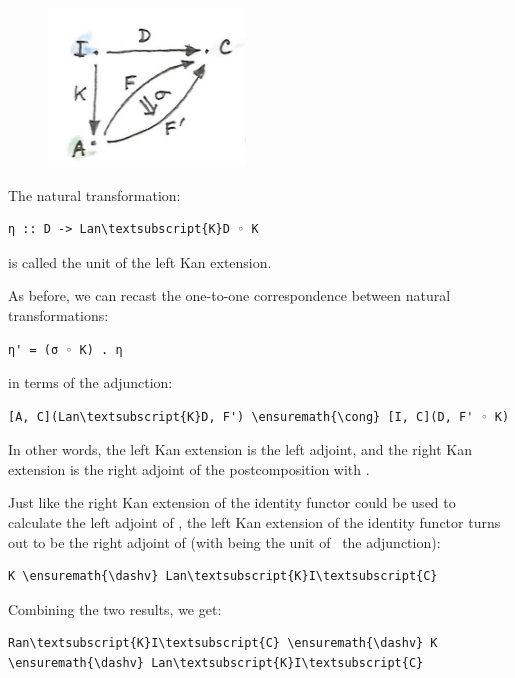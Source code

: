 \begin{figure}[H]
\centering
\includegraphics[width=2.06250in]{images/kan12.jpg}
\end{figure}

\noindent
The natural transformation:

\begin{Verbatim}[commandchars=\\\{\}]
η :: D -> Lan\textsubscript{K}D ◦ K
\end{Verbatim}
is called the unit of the left Kan extension.

As before, we can recast the one-to-one correspondence between natural
transformations:

\begin{Verbatim}[commandchars=\\\{\}]
η' = (σ ◦ K) . η
\end{Verbatim}
in terms of the adjunction:

\begin{Verbatim}[commandchars=\\\{\}]
[A, C](Lan\textsubscript{K}D, F') \ensuremath{\cong} [I, C](D, F' ◦ K)
\end{Verbatim}
In other words, the left Kan extension is the left adjoint, and the
right Kan extension is the right adjoint of the postcomposition with
.

Just like the right Kan extension of the identity functor could be used
to calculate the left adjoint of , the left Kan extension of
the identity functor turns out to be the right adjoint of 
(with  being the unit of~ the adjunction):

\begin{Verbatim}[commandchars=\\\{\}]
K \ensuremath{\dashv} Lan\textsubscript{K}I\textsubscript{C}
\end{Verbatim}
Combining the two results, we get:

\begin{Verbatim}[commandchars=\\\{\}]
Ran\textsubscript{K}I\textsubscript{C} \ensuremath{\dashv} K \ensuremath{\dashv} Lan\textsubscript{K}I\textsubscript{C}
\end{Verbatim}

